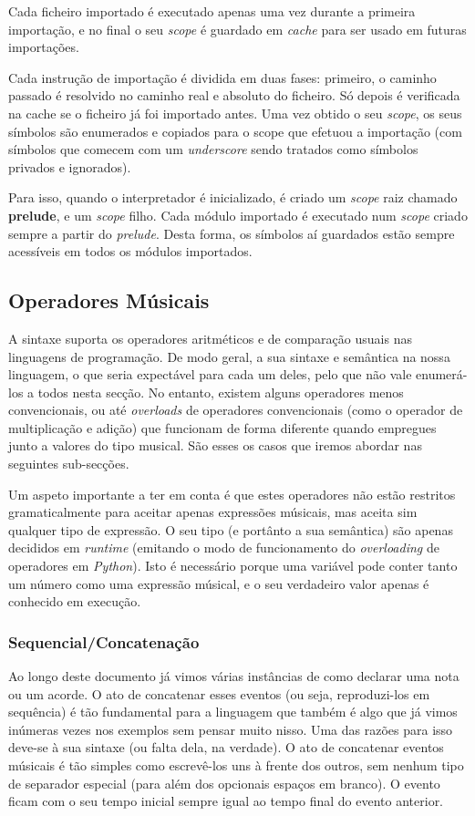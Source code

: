 Cada ficheiro importado é executado apenas uma vez durante a primeira importação, e no final o seu \textit{scope} é guardado em \textit{cache} para ser usado em futuras importações.

Cada instrução de importação é dividida em duas fases: primeiro, o caminho passado é resolvido no caminho real e absoluto do ficheiro. Só depois é verificada na cache  se o ficheiro já foi importado antes. Uma vez obtido o seu \textit{scope}, os seus símbolos são enumerados e copiados para o scope que efetuou a importação (com símbolos que comecem com um \textit{underscore} sendo tratados como símbolos privados e ignorados).

Para isso, quando o interpretador é inicializado, é criado um \textit{scope} raiz chamado \textbf{prelude}, e um \textit{scope} filho. Cada módulo importado é executado num \textit{scope} criado sempre a partir do \textit{prelude}. Desta forma, os símbolos aí guardados estão sempre acessíveis em todos os módulos importados.


\subsection{Operadores Músicais}
A sintaxe suporta os operadores aritméticos e de comparação usuais nas linguagens de programação. De modo geral, a sua sintaxe e semântica na nossa linguagem, o que seria expectável para cada um deles, pelo que não vale enumerá-los a todos nesta secção. No entanto, existem alguns operadores menos convencionais, ou até \textit{overloads} de operadores convencionais (como o operador de multiplicação e adição) que funcionam de forma diferente quando empregues junto a valores do tipo musical. São esses os casos que iremos abordar nas seguintes sub-secções.

Um aspeto importante a ter em conta é que estes operadores não estão restritos gramaticalmente para aceitar apenas expressões músicais, mas aceita sim qualquer tipo de expressão. O seu tipo (e portânto a sua semântica) são apenas decididos em \textit{runtime} (emitando o modo de funcionamento do \textit{overloading} de operadores em \textit{Python}). Isto é necessário porque uma variável pode conter tanto um número como uma expressão músical, e o seu verdadeiro valor apenas é conhecido em execução.

\subsubsection{Sequencial/Concatenação}
Ao longo deste documento já vimos várias instâncias de como declarar uma nota ou um acorde. O ato de concatenar esses eventos (ou seja, reproduzi-los em sequência) é tão fundamental para a linguagem que também é algo que já vimos inúmeras vezes nos exemplos sem pensar muito nisso. Uma das razões para isso deve-se à sua sintaxe (ou falta dela, na verdade). O ato de concatenar eventos músicais é tão simples como escrevê-los uns à frente dos outros, sem nenhum tipo de separador especial (para além dos opcionais espaços em branco). O evento ficam com o seu tempo inicial sempre igual ao tempo final do evento anterior.

